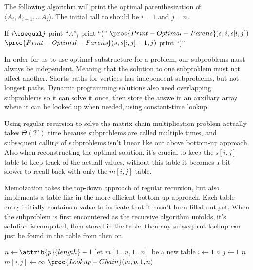 \documentclass[11pt]{article}
\theoremstyle{definition}
\begin{document}
The following algorithm will print the optimal parenthesization of 
\(\langle A_i, A_{i+1}, \dots A_j \rangle\).  The initial call to  
should be \(i=1\) and \(j=n\).

\begin{codebox}
  \li If \(i \isequal j\) \Then 
  \li print ``\(A\)''\(_i\) \End 
  \li \Else print ``('' \Then
    \li \(\proc{Print-Optimal-Parens}(s,i,s[i,j])\)
    \li \(\proc{Print-Optimal-Parens}(s,s[i,j]+1,j)\)
    \li print ``)'' \End
\end{codebox}

In order for us to use optimal substructure for a problem, our subproblems must always be 
independent.  Meaning that the solution to one subproblem must not affect another.  Shorts 
paths for vertices has independent subproblems, but not longest paths.  Dynamic programming 
solutions also need overlapping subproblems so it can solve it once, then store the answe in 
an auxiliary array where it can be looked up when needed, using constant-time lookup.
\newpage 

Using regular recursion to solve the matrix chain multiplication problem actually takes 
\(\Theta(2^n)\) time because subproblems are called multiple times, and subsequent calling 
of subproblems isn't linear like our above bottom-up approach.  Also when reconstructing the 
optimal solution, it's crucial to keep the \(s[i,j]\) table to keep track of the actuall values, 
without this table it becomes a bit slower to recall back with only the \(m[i,j]\) table.

Memoization takes the top-down approach of regular recursion, but also implements a table like 
in the more efficient bottom-up approach.  Each table entry initially contains a value to indicate 
that it hasn't been filled out yet.  When the subproblem is first encountered as the recursive 
algorithm unfolds, it's solution is computed, then stored in the table, then any subsequent lookup 
can just be found in the table from then on.

\begin{codebox}
  \li \(n \gets \attrib{p}{length}-1\)
  \li let \(m[1 \dots n, 1 \dots n]\) be a new table
  \li \For \(i \gets 1\) \To \(n\) \Do
    \li \For \(j \gets 1\) \To \(n\) \Do
      \li \(m[i,j] \gets \infty\) \End \End
  \li \Return \(\proc{Lookup-Chain}(m,p,1,n)\)
\end{codebox}
\end{document}
